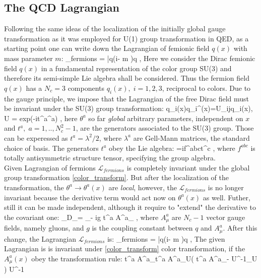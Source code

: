 	\subsection{The QCD Lagrangian}
	Following the same ideas of the localization of the initially global gauge transformation as it was employed for U(1) group transformation in QED, as a starting point one can write down the Lagrangian of femionic field $q(x)$ with mass parameter $m$:
	\beqa
		_{fermions} = \bar{q}(i\dslash - m )q \;,
	\eeqa
	Here we consider the Dirac femionic field $q(x)$ in a fundamental representation of the color group SU(3) and therefore its semi-simple Lie algebra\cite{--} shall be considered. Thus the fermion field $q(x)$ has a $N_c=3$ components $q_i(x), \; i=1,2,3$, reciprocal to colors. Due to the gauge principle, we impose that the Lagrangian of the free Dirac field must be invariant under the SU(3) group transformation:
	\beqa
		\label{color_transform}
		q_i(x)\rightarrow  q_i^\prime(x)=U_{ij}q_i(x), \;\; U = exp(-it^a\theta^a) \;,
	\eeqa
	here $\theta^a$ so far \textit{global} arbitrary parameters, independent on $x$ and $t^a, \; a=1,..,N^2_c-1$, are the generators associated to the SU(3) group. Those can be experessed as $t^a=\lambda^2/2$, where $\lambda^a$ are Gell-Mann matrices, the standard choice of basis\cite{--}. The generators $t^a$ obey the Lie algebra:
	\beqa
		[t^a,t^b]=if^{abc}t^c \;,
	\eeqa
	where $f^{abc}$ is totally antisymmetric structure tensor, specifying the group algebra. 
	\\
	Given Lagrangian of fermions $\mathcal{L}_{fermions}$ is completely invariant under the global group transformation \ref{color_transform}. But after the localization of the transformation, the $\theta^a\rightarrow \theta^a(x)$ are \textit{local}, however, the $\mathcal{L}_{fermions}$ is no longer invariant because the derivative term would act now on $\theta^a(x)$ as well. Futher, still it can be made independent, although it require to "extend" the derivative to the covariant one:
	\beqa
		\partial_\mu \rightarrow D_\mu = \partial_\mu - ig t^a A^a_\mu \; ,
	\eeqa
	where $A^a_\mu$ are $N_c-1$ vector gauge fields, namely gluons, and $g$ is the coupling constant between $q$  and $A^a_\mu$. After this change, the Lagrangian $\mathcal{L}_{fermions}$ is:
	\beqa
		_{fermions} = \bar{q}(i\Dslash - m )q \;,
	\eeqa
	The given Lagrangian is is invariant under \ref{color_transform} color transformation, if the $A^a_\mu(x)$ obey the transformation rule:
	\beqa
		t^a A^a_\mu \rightarrow t^a A^{\prime a}_\mu U\left( t^a A^a_\mu - U^{-1}\partial_\mu U \right) U^{-1} 
	\eeqa
